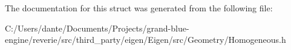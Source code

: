 The documentation for this struct was generated from the following file\+:\begin{DoxyCompactItemize}
\item 
C\+:/\+Users/dante/\+Documents/\+Projects/grand-\/blue-\/engine/reverie/src/third\+\_\+party/eigen/\+Eigen/src/\+Geometry/Homogeneous.\+h\end{DoxyCompactItemize}

